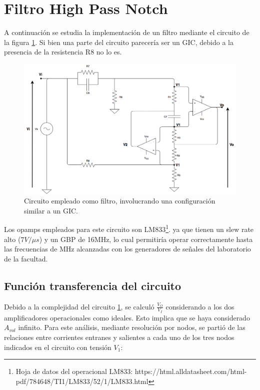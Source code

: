 
\section{Filtro High Pass Notch}

A continuaci\'on se estudia la implementaci\'on de un filtro mediante el circuito de la figura \ref{circ1}. Si bien una parte del circuito parecer\'ia ser un GIC, debido a la presencia de la resistencia R8 no lo es.

\begin{figure}[H] %
	\centering
	\includegraphics[scale=0.4]{../EJ1/circuito1.png}
	\caption{Circuito empleado como filtro, involucrando una configuraci\'on similar a un GIC.}
	\label{circ1}
\end{figure}

Los opamps empleados para este circuito son LM833\footnote{Hoja de datos del operacional LM833: https://html.alldatasheet.com/html-pdf/784648/TI1/LM833/52/1/LM833.html}. ya que tienen un slew rate alto ($7V/\mu s$) y un GBP de 16MHz, lo cual permitir\'ia operar correctamente hasta las frecuencias de MHz alcanzadas con los generadores de se\~nales del laboratorio de la facultad.

\subsection{Funci\'on transferencia del circuito}
Debido a la complejidad del circuito \ref{circ1}, se  calcul\'o $\frac{V_O}{V_I}$ considerando a los dos amplificadores operacionales como ideales. Esto implica que se haya considerado $A_{vol}$ infinito. Para este an\'alisis, mediante resoluci\'on por nodos, se parti\'o de las relaciones entre corrientes entranes y salientes a cada uno de los tres nodos indicados en el circuito con tensi\'on $V_1$:

